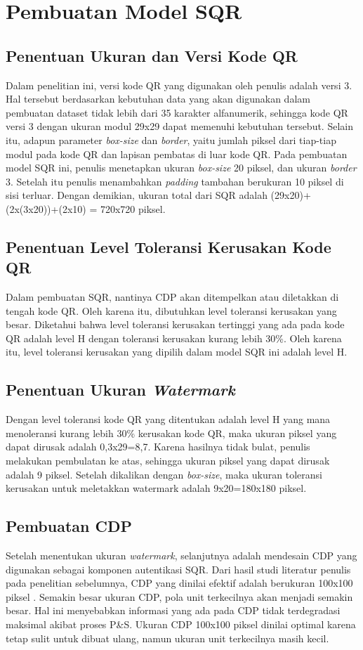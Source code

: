 \section{Pembuatan Model SQR}
\subsection{Penentuan Ukuran dan Versi Kode QR}
Dalam penelitian ini, versi kode QR yang digunakan oleh penulis adalah versi 3. Hal tersebut berdasarkan kebutuhan data yang akan digunakan dalam pembuatan
dataset tidak lebih dari 35 karakter alfanumerik, sehingga kode QR versi 3 dengan ukuran modul 29x29 dapat memenuhi kebutuhan tersebut. Selain itu, adapun
parameter \emph{box-size} dan \emph{border}, yaitu jumlah piksel dari tiap-tiap modul pada kode QR dan lapisan pembatas di luar kode QR. Pada pembuatan model
SQR ini, penulis menetapkan ukuran \emph{box-size} 20 piksel, dan ukuran \emph{border} 3. Setelah itu penulis menambahkan \emph{padding} tambahan berukuran 10
piksel di sisi terluar. Dengan demikian, ukuran total dari SQR adalah (29x20)+(2x(3x20))+(2x10) = 720x720 piksel.

\subsection{Penentuan Level Toleransi Kerusakan Kode QR}
Dalam pembuatan SQR, nantinya CDP akan ditempelkan atau diletakkan di tengah kode QR. Oleh karena itu, dibutuhkan level toleransi kerusakan yang besar.
Diketahui bahwa level toleransi kerusakan tertinggi yang ada pada kode QR adalah level H dengan toleransi kerusakan kurang lebih 30\%. Oleh karena itu, level
toleransi kerusakan yang dipilih dalam model SQR ini adalah level H.

\subsection{Penentuan Ukuran \emph{Watermark}}
Dengan level toleransi kode QR yang ditentukan adalah level H yang mana menoleransi kurang lebih 30\% kerusakan kode QR, maka ukuran piksel yang dapat dirusak adalah 0,3x29=8,7. Karena hasilnya tidak bulat, penulis melakukan pembulatan ke atas, sehingga ukuran piksel yang dapat dirusak adalah 9 piksel. Setelah dikalikan dengan \emph{box-size}, maka ukuran toleransi kerusakan untuk meletakkan watermark adalah 9x20=180x180 piksel.

\subsection{Pembuatan CDP}
Setelah menentukan ukuran \emph{watermark}, selanjutnya adalah mendesain CDP yang digunakan sebagai komponen autentikasi SQR. Dari hasil studi literatur
penulis pada penelitian sebelumnya, CDP yang dinilai efektif adalah berukuran 100x100 piksel \cite{PICARDCANCOPYDETECTIONPATTERN}. Semakin besar ukuran CDP,
pola unit terkecilnya akan menjadi semakin besar. Hal ini menyebabkan informasi yang ada pada CDP tidak terdegradasi maksimal akibat proses P\&S. Ukuran CDP
100x100 piksel dinilai optimal karena tetap sulit untuk dibuat ulang, namun ukuran unit terkecilnya masih kecil.


